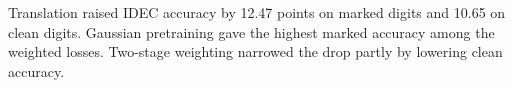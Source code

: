 Translation raised IDEC accuracy by 12.47 points on marked digits and 10.65 on clean digits. Gaussian pretraining gave the highest marked accuracy among the weighted losses. Two-stage weighting narrowed the drop partly by lowering clean accuracy.
